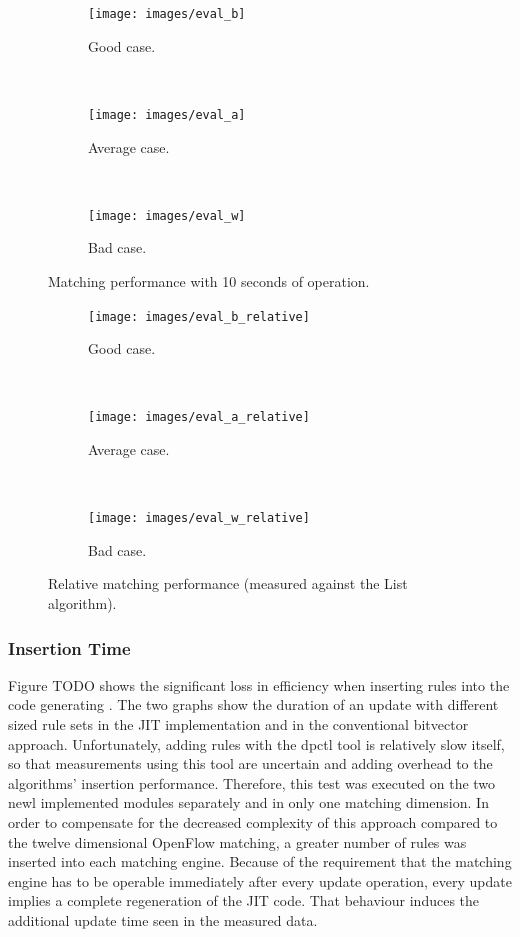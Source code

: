 \documentclass[a4paper,
		12pt,
		parskip=full,
		titlepage
		]{scrartcl}
\begin{document}
\begin{figure}
    \centering
    \begin{subfigure}{.45\linewidth}
        \centering
        \texttt{[image: images/eval\_b]}
        \caption{Good case.}
        \label{fig:eval_good_case}
    \end{subfigure}
    ~
    \begin{subfigure}{.45\linewidth}
        \centering
        \texttt{[image: images/eval\_a]}
        \caption{Average case.}
        \label{fig:eval_average_case}
    \end{subfigure}
    ~
    \begin{subfigure}{.45\linewidth}
        \centering
        \texttt{[image: images/eval\_w]}
        \caption{Bad case.}
        \label{fig:eval_bad_case}
    \end{subfigure}
    \caption{Matching performance with 10 seconds of operation.}
\end{figure}

\begin{figure}
    \centering
    \begin{subfigure}{.45\linewidth}
        \centering
        \texttt{[image: images/eval\_b\_relative]}
        \caption{Good case.}
        \label{fig:eval_good_case_relative}
    \end{subfigure}
    ~
    \begin{subfigure}{.45\linewidth}
        \centering
        \texttt{[image: images/eval\_a\_relative]}
        \caption{Average case.}
        \label{fig:eval_average_case_relative}
    \end{subfigure}
    ~
    \begin{subfigure}{.45\linewidth}
        \centering
        \texttt{[image: images/eval\_w\_relative]}
        \caption{Bad case.}
        \label{fig:eval_bad_case_relative}
    \end{subfigure}
    \caption{Relative matching performance (measured against the List algorithm).}
\end{figure}

\subsubsection{Insertion Time}
Figure TODO shows the significant loss in efficiency when inserting rules into the code generating . %
The two graphs show the duration of an update with different sized rule sets in the JIT implementation and in the conventional bitvector approach.
Unfortunately, adding rules with the \textsf{dpctl} tool is relatively slow itself, so that measurements using this tool
are uncertain and adding overhead to the algorithms' insertion performance.
Therefore, this test was executed on the two newl implemented modules separately and in only one matching dimension.
In order to compensate for the decreased complexity of this approach compared to the twelve dimensional OpenFlow matching,
a greater number of rules was inserted into each matching engine.
Because of the requirement that the matching engine has to be operable 
immediately after every update operation, every update implies a complete regeneration of the JIT code.
That behaviour induces the additional update time seen in the measured data.
\end{document}

